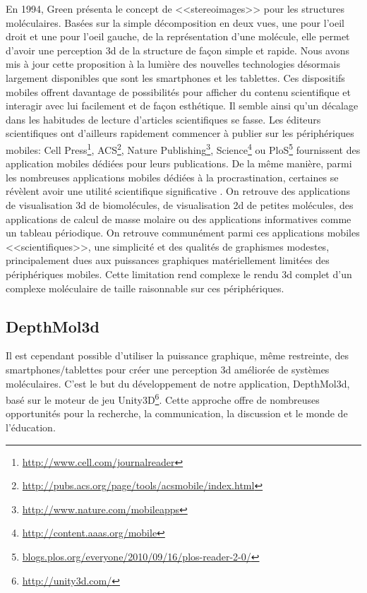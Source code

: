 En 1994, Green présenta le concept de <<stereoimages>> \cite{green_stereoimages_1994} pour les structures moléculaires. Basées sur la simple décomposition en deux vues, une pour l'oeil droit et une pour l'oeil gauche, de la représentation d'une molécule, elle permet d'avoir une perception 3d de la structure de façon simple et rapide. Nous avons mis à jour cette proposition à la lumière des nouvelles technologies désormais largement disponibles que sont les smartphones et les tablettes. Ces dispositifs mobiles offrent davantage de possibilités pour afficher du contenu scientifique et interagir avec lui facilement et de façon esthétique. Il semble ainsi qu'un décalage dans les habitudes de lecture d'articles scientifiques se fasse. Les éditeurs scientifiques ont d'ailleurs rapidement commencer à publier sur les périphériques mobiles: Cell Press\footnote{\url{http://www.cell.com/journalreader}}, ACS\footnote{\url{http://pubs.acs.org/page/tools/acsmobile/index.html}}, Nature Publishing\footnote{\url{http://www.nature.com/mobileapps}}, Science\footnote{\url{http://content.aaas.org/mobile}} ou PloS\footnote{\url{blogs.plos.org/everyone/2010/09/16/plos-reader-2-0/}} fournissent des application mobiles dédiées pour leurs publications. De la même manière, parmi les nombreuses applications mobiles dédiées à la procrastination, certaines se révèlent avoir une utilité scientifique significative \cite{powell_lab_2012}. On retrouve des applications de visualisation 3d de biomolécules, de visualisation 2d de petites molécules, des applications de calcul de masse molaire ou des applications informatives comme un tableau périodique. On retrouve communément parmi ces applications mobiles <<scientifiques>>, une simplicité et des qualités de graphismes modestes, principalement dues aux puissances graphiques matériellement limitées des périphériques mobiles. Cette limitation rend complexe le rendu 3d complet d'un complexe moléculaire de taille raisonnable sur ces périphériques.

\subsection{DepthMol3d}

Il est cependant possible d'utiliser la puissance graphique, même restreinte, des smartphones/tablettes pour créer une perception 3d améliorée de systèmes moléculaires. C'est le but du développement de notre application, DepthMol3d, basé sur le moteur de jeu Unity3D\footnote{\url{http://unity3d.com/}}. Cette approche offre de nombreuses opportunités pour la recherche, la communication, la discussion et le monde de l'éducation.


